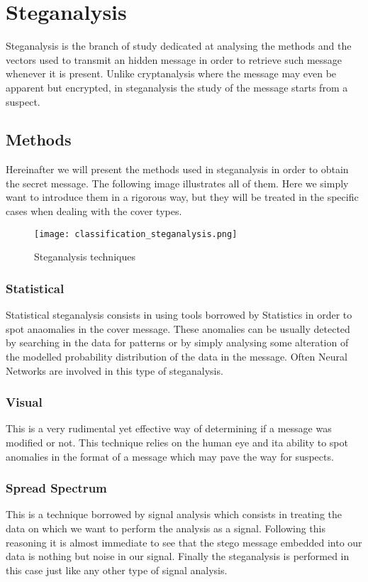 \documentclass[../../main.tex]{subfiles}
\begin{document}
    
    \section{Steganalysis}
    Steganalysis is the branch of study dedicated at analysing the methods and
    the vectors used to transmit an hidden message in order to retrieve such
    message whenever it is present.
    Unlike cryptanalysis where the message may even be apparent but encrypted,
    in steganalysis the study of the message starts from a suspect.
    \subsection{Methods}
    Hereinafter we will present the methods used in steganalysis in
    order to obtain the secret message. The following image illustrates all of
    them. Here we simply want to introduce them in a rigorous way, but they will
    be treated in the specific cases when dealing with the cover types.

    \begin{figure}[h]
        \centering
        \caption{Steganalysis techniques}
        \texttt{[image: classification\_steganalysis.png]}
    \end{figure}


    \subsubsection{Statistical}
    Statistical steganalysis consists in using tools borrowed by Statistics in
    order to spot anaomalies in the cover message. These anomalies can be
    usually detected by searching in the data for patterns or by simply
    analysing some alteration of the modelled probability distribution of the
    data in the message. Often Neural Networks are involved in this type of
    steganalysis.

    \subsubsection{Visual}
    This is a very rudimental yet effective way of determining if a message was
    modified or not. This technique relies on the human eye and ita ability to
    spot anomalies in the format of a message which may pave the way for
    suspects.
    
    \subsubsection{Spread Spectrum}
    This is a technique borrowed by signal analysis which consists in treating
    the data on which we want to perform the analysis as a signal. Following
    this reasoning it is almost immediate to see that the stego message embedded
    into our data is nothing but noise in our signal. Finally the steganalysis
    is performed in this case just like any other type of signal analysis.
\end{document}
